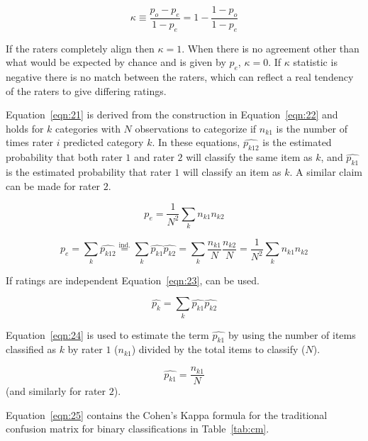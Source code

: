 \documentclass[sn-mathphys-num]{sn-jnl}%
\begin{document}
\begin{equation}
	\kappa \equiv {\frac {p_{o}-p_{e}}{1-p_{e}}}=1-{\frac {1-p_{o}}{1-p_{e}}}
	\label{eqn:20}
\end{equation}

If the raters completely align then $\kappa = 1$. When there is no agreement other than what would be expected by chance and is given by $p_{e}$, $\kappa = 0$. If $\kappa$ statistic is negative \cite{sim2005kappa} there is no match between the raters, which can reflect a real tendency of the raters to give differing ratings.

Equation~\ref{eqn:21} is derived from the construction in Equation~\ref{eqn:22} and holds for $k$ categories with $N$ observations to categorize if $n_{k1}$ is the number of times rater $i$ predicted category $k$. In these equations, ${\widehat{p_{k12}}}$ is the estimated probability that both rater $1$ and rater $2$ will classify the same item as $k$, and ${\widehat {p_{k1}}}$ is the estimated probability that rater $1$ will classify an item as $k$. A similar claim can be made for rater $2$.

\begin{equation}
	p_{e}={\frac {1}{N^{2}}}\sum_{k}n_{k1}n_{k2}
	\label{eqn:21}
\end{equation}

\begin{equation}
	p_{e}=\sum_{k}{\widehat {p_{k12}}}{\overset{\text{ind.}}{=}}\sum_{k}{\widehat {p_{k1}}}{\widehat {p_{k2}}}=\sum_{k}{\frac {n_{k1}}{N}}{\frac {n_{k2}}{N}}={\frac {1}{N^{2}}}\sum_{k}n_{k1}n_{k2}
	\label{eqn:22}
\end{equation}

If ratings are independent Equation~\ref{eqn:23}, can be used.

\begin{equation}
	\textstyle{\widehat{p_{k}}}=\sum_{k}{\widehat{p_{k1}}}{\widehat {p_{k2}}}
	\label{eqn:23}
\end{equation}

Equation~\ref{eqn:24} is used to estimate the term $\widehat{p_{k1}}$ by using the number of items classified as $k$ by rater $1$ ($n_{k1}$) divided by the total items to classify ($N$).

\begin{equation}
	\widehat {p_{k1}}=\frac{n_{k1}}{N}
	\label{eqn:24}
\end{equation}
 (and similarly for rater $2$).
 
Equation~\ref{eqn:25} contains the Cohen's Kappa formula \cite{chicco2021matthews} for the traditional confusion matrix for binary classifications in Table~\ref{tab:cm}.
\end{document}
